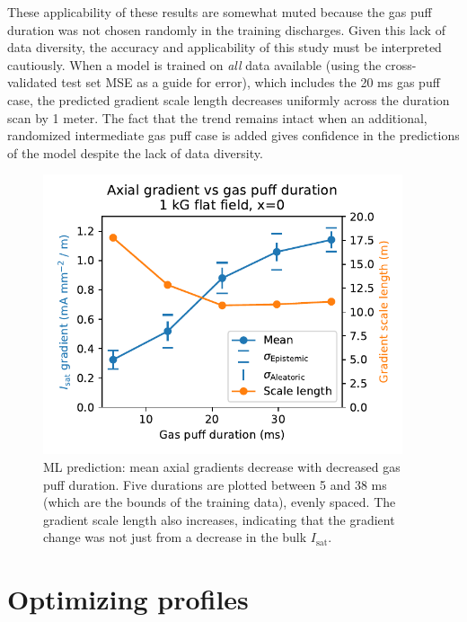 These applicability of these results are somewhat muted because the gas puff duration was not chosen randomly in the training discharges. 
Given this lack of data diversity, the accuracy and applicability of this study must be interpreted cautiously. When a model is trained on \emph{all} data available (using the cross-validated test set MSE as a guide for error), which includes the 20 ms gas puff case, the predicted gradient scale length decreases uniformly across the duration scan by 1 meter. The fact that the trend remains intact when an additional, randomized intermediate gas puff case is added gives confidence in the predictions of the model despite the lack of data diversity.

\begin{figure}
	\centering
	\includegraphics[width=300pt]{figures/axial-grad_gas-puff.pdf}
	\caption[size=12]{\label{fig:axial-grad_gas-puff.pdf}ML prediction: mean axial gradients decrease with decreased gas puff duration. Five durations are plotted between 5 and 38 ms (which are the bounds of the training data), evenly spaced. The gradient scale length also increases, indicating that the gradient change was not just from a decrease in the bulk $I_\text{sat}$.}
\end{figure}

\section{Optimizing profiles}
\label{sec:optimization}

